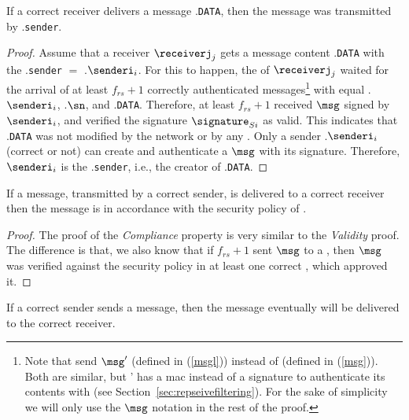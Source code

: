 \begin{validity}

If a correct receiver delivers a message \msg.\texttt{DATA}, then the message was transmitted by \msg.\texttt{sender}.
\end{validity}

\begin{proof}
Assume that a receiver $\receiverj_j$ gets a message content \msg.\texttt{DATA} with the \msg.\texttt{sender} $=$ \msg.\texttt{$\senderi_i$}.
For this to happen, the \postsieve of $\receiverj_j$ waited for the arrival of at least $f_{rs}+1$ correctly authenticated messages\footnote{Note that \repsieves send $\msg'$ (defined in (\ref{msgl}))  instead of \msg (defined in (\ref{msg})). Both are similar, but \msg' has a \gls{mac} instead of a signature to authenticate its contents with \postsieve (see Section~\ref{sec:repseivefiltering}). For the sake of simplicity we will only use the $\msg$ notation in the rest of the proof.} with equal \msg.\texttt{$\senderi_i$}, \msg.$\sn$, and \msg.\texttt{DATA}.
Therefore, at least $f_{rs}+1$ \repsieves received $\msg$ signed by $\senderi_i$, and verified the signature $\signature_{Si}$ as valid.
This indicates that \msg.\texttt{DATA} was not modified by the network or by any \presieve.
Only a sender \msg.\texttt{$\senderi_i$} (correct or not) can create and authenticate a $\msg$ with its signature.
Therefore, $\senderi_i$ is the \msg.\texttt{sender}, i.e., the creator of \msg.\texttt{DATA}.
\end{proof}


\begin{security}
If a message, transmitted by a correct sender, is delivered to a correct receiver then the message is in accordance with the security policy of \sieveq.
\end{security}


\begin{proof}
The proof of the \emph{Compliance} property is very similar to the \emph{Validity} proof.
The difference is that, we also know that if $f_{rs}+1$ \repsieves sent $\msg$ to a \postsieve, then $\msg$ was verified against the security policy in at least one correct \repsieve, which approved it.
\end{proof}



\begin{liveness}
If a correct sender sends a message, then the message eventually will be delivered to the correct receiver.
\end{liveness}

